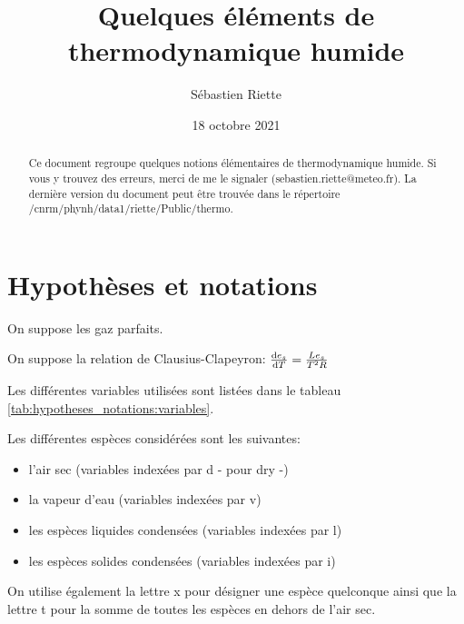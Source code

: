 \documentclass{article}
\title{Quelques éléments de thermodynamique humide}
\author{Sébastien Riette}
\date{18 octobre 2021}
\begin{document}
\maketitle

\begin{abstract}
Ce document regroupe quelques notions élémentaires de thermodynamique humide.
Si vous y trouvez des erreurs, merci de me le signaler (sebastien.riette@meteo.fr).
La dernière version du document peut être trouvée dans le répertoire /cnrm/phynh/data1/riette/Public/thermo.
\end{abstract}

\tableofcontents

\section{Hypothèses et notations}
\label{sec:hypotheses_notations}
On suppose les gaz parfaits.

On suppose la relation de Clausius-Clapeyron: $\frac{{\rm d} e_s}{{\rm d} T}=\frac{L e_s}{T^2 R}$

Les différentes variables utilisées sont listées dans le tableau \ref{tab:hypotheses_notations:variables}.

Les différentes espèces considérées sont les suivantes:
\begin{itemize}
 \item l'air sec (variables indexées par d - pour dry -)
 \item la vapeur d'eau (variables indexées par v)
 \item les espèces liquides condensées (variables indexées par l)
 \item les espèces solides condensées (variables indexées par i)
\end{itemize}
On utilise également la lettre x pour désigner une espèce quelconque ainsi que la lettre t pour la somme de toutes les espèces en dehors de l'air sec.
\end{document}
